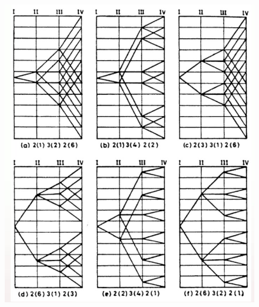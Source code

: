 \documentclass{article}
\begin{document}
\begin{multicols*}{2}
  \begin{figure}[H]
    \begin{center}
      \includegraphics[width=\columnwidth]{img/structural_diagram.jpeg}
    \end{center}
  \end{figure}


\end{multicols*}
\end{document}
